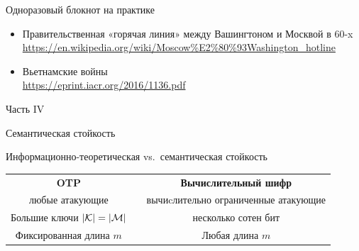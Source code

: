 \documentclass[usenames,dvipsnames,8pt,aspectratio=169]{beamer}
\begin{document}
\begin{frame}{Одноразовый блокнот на практике}
\Large
\begin{itemize}
\itemsep 12pt
\item Правительственная «горячая линия» между Вашингтоном и Москвой в 60-x\\[4pt]
\url{https://en.wikipedia.org/wiki/Moscow\%E2\%80\%93Washington_hotline}

\item Вьетнамские войны\\[4pt]
\url{https://eprint.iacr.org/2016/1136.pdf}
\end{itemize}

\end{frame}

\begin{frame}
Часть IV \\ [10pt]
\begin{LARGE}
	
	\color{Orange}
	\Huge Семантическая стойкость
	
\end{LARGE}
\end{frame}

\begin{frame}{Информационно-теоретическая vs.\ семантическая стойкость}
\LARGE

\begin{table}
	
	\begin{tabular}{c p{0.6cm} c}
		\textbf{\color{Orange}OTP}  &  & \textbf{\color{Orange} Вычислительный шифр} \\[10pt]
		
		{\color{Orange}любые } атакующие &  &  {\color{Orange}вычиcлительно ограниченные } атакующие \\[10pt]
		
		Большие ключи $|\mathcal{K}| = |\mathcal{M}|$ &  & несколько сотен бит \\[10pt]
		
		Фиксированная длина $m$  &  &Любая длина $m$
		
	\end{tabular}
\end{table}

\end{frame}
\end{document}
